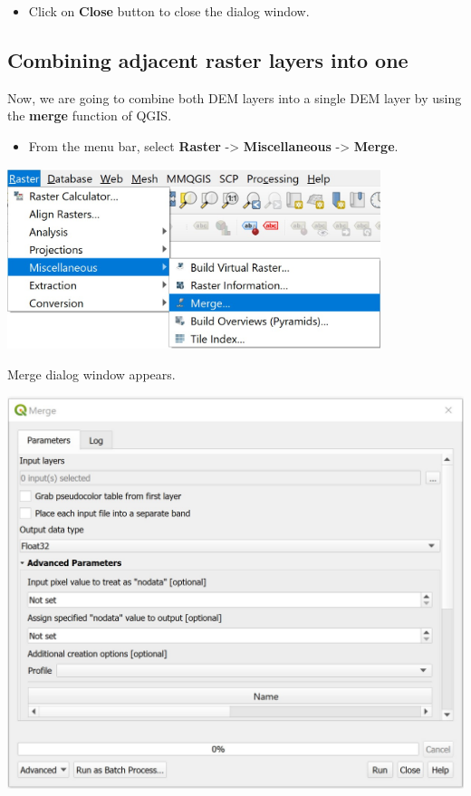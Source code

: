 \documentclass[
  letterpaper,
  DIV=11,
  numbers=noendperiod]{scrreprt}
\providecommand{\tightlist}{%
  \setlength{\itemsep}{0pt}\setlength{\parskip}{0pt}}\usepackage{longtable,booktabs,array}
\begin{document}
\begin{itemize}
\tightlist
\item
  Click on \textbf{Close} button to close the dialog window.
\end{itemize}

\hypertarget{combining-adjacent-raster-layers-into-one}{%
\subsection{Combining adjacent raster layers into
one}\label{combining-adjacent-raster-layers-into-one}}

Now, we are going to combine both DEM layers into a single DEM layer by
using the \textbf{merge} function of QGIS.

\begin{itemize}
\tightlist
\item
  From the menu bar, select \textbf{Raster} -\textgreater{}
  \textbf{Miscellaneous} -\textgreater{} \textbf{Merge}.
\end{itemize}

\includegraphics[width=4.29167in,height=\textheight]{./img06/image37.jpg}

Merge dialog window appears.

\includegraphics[width=6.05208in,height=\textheight]{./img06/image38.jpg}
\end{document}
